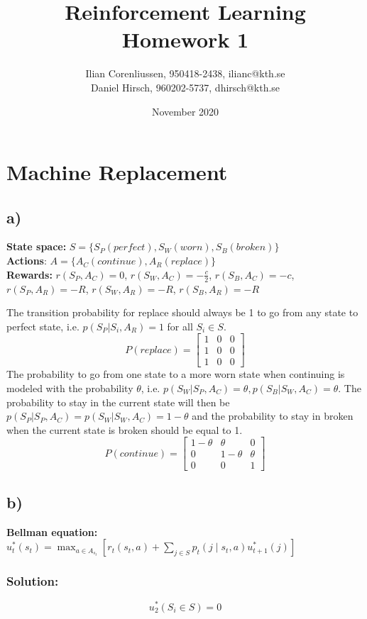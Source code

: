 \documentclass{article}
\title{Reinforcement Learning\\
       Homework 1}
\author{Ilian Corenliussen, 950418-2438, ilianc@kth.se\\ 
        Daniel Hirsch, 960202-5737, dhirsch@kth.se}
\date{November 2020}
\begin{document}
\maketitle

\section{Machine Replacement}
\subsection*{a)}
\textbf{State space:} $S = \{S_P(perfect), S_W(worn), S_B(broken)\} $\\
\textbf{Actions}: $A = \{ A_C (continue), A_R(replace) \}$\\
\textbf{Rewards:} $r(S_P,A_C) = 0$, $r(S_W,A_C) = -\frac{c}{2}$, $r(S_B,A_C) = -c$, $r(S_P, A_R) = -R$, $r(S_W, A_R) = -R$, $r(S_B, A_R) = -R$


The transition probability for replace should always be 1 to go from any state to perfect state, i.e. $p(S_P|S_i, A_R) = 1$ for all $S_i \in S$.  
\[
		P(replace) = \begin{bmatrix}
		        1 & 0 & 0 \\
		        1 & 0 & 0\\
		        1 & 0 & 0
		        \end{bmatrix}
\]
The probability to go from one state to a more worn state when continuing is modeled with the probability $\theta$, i.e. $p(S_W|S_P,A_C)=\theta, p(S_B|S_W,A_C)=\theta$. The probability to stay in the current state will then be $p(S_P|S_P,A_C)=p(S_W|S_W,A_C)=1-\theta$ and the probability to stay in broken when the current state is broken should be equal to 1.
\[
		P(continue) = \begin{bmatrix}
		        1-\theta & \theta & 0 \\
		        0 & 1-\theta & \theta\\
		        0 & 0 & 1
		        \end{bmatrix}
\]
\subsection*{b)}
\textbf{Bellman equation:} $u_{t}^{*}\left(s_{t}\right)=\max _{a \in A_{s_{t}}}\left[r_{t}\left(s_{t}, a\right)+\sum_{j \in S} p_{t}\left(j \mid s_{t}, a\right) u_{t+1}^{*}\left(j\right)\right]$

\subsubsection*{Solution:}
\begin{equation}
u_{2}^{*}(S_i \in S)  = 0
\end{equation}
\end{document}
